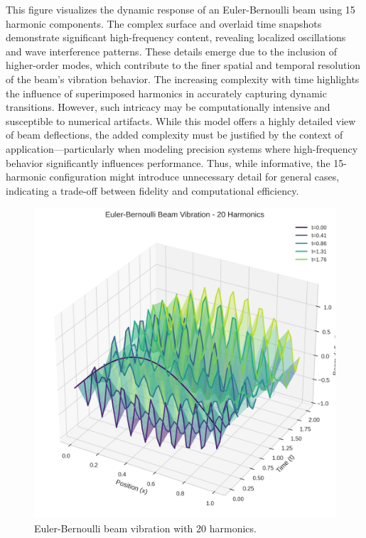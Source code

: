 \documentclass[preprint,12pt]{elsarticle}
\begin{document}
This figure visualizes the dynamic response of an Euler-Bernoulli beam using 15 harmonic components. The complex surface and overlaid time snapshots demonstrate significant high-frequency content, revealing localized oscillations and wave interference patterns. These details emerge due to the inclusion of higher-order modes, which contribute to the finer spatial and temporal resolution of the beam's vibration behavior. The increasing complexity with time highlights the influence of superimposed harmonics in accurately capturing dynamic transitions. However, such intricacy may be computationally intensive and susceptible to numerical artifacts. While this model offers a highly detailed view of beam deflections, the added complexity must be justified by the context of application—particularly when modeling precision systems where high-frequency behavior significantly influences performance. Thus, while informative, the 15-harmonic configuration might introduce unnecessary detail for general cases, indicating a trade-off between fidelity and computational efficiency.

\begin{figure}[t]
    \centering
    \includegraphics[width=0.9\linewidth]{figures/euler_bernoulli_3d_20h.png}
    \caption{Euler-Bernoulli beam vibration with 20 harmonics.}
    \label{fig:euler_20h}
\end{figure}
\end{document}
